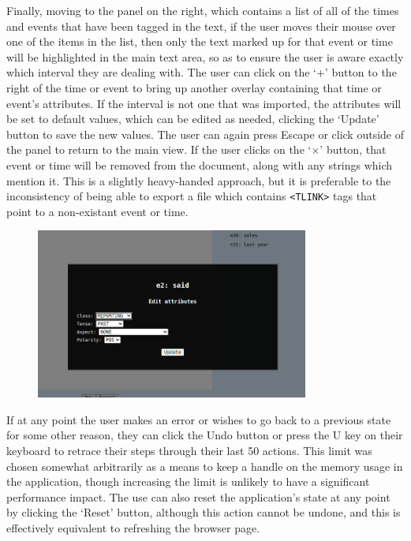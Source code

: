 \documentclass[a4paper,12pt,leqno]{article}
\begin{document}
Finally, moving to the panel on the right, which contains a list of all of the times and events that have been tagged in the text, if the user moves their mouse over one of the items in the list, then only the text marked up for that event or time will be highlighted in the main text area, so as to ensure the user is aware exactly which interval they are dealing with. The user can click on the `+' button to the right of the time or event to bring up another overlay containing that time or event's attributes. If the interval is not one that was imported, the attributes will be set to default values, which can be edited as needed, clicking the `Update' button to save the new values. The user can again press Escape or click outside of the panel to return to the main view. If the user clicks on the `$\times$' button, that event or time will be removed from the document, along with any strings which mention it. This is a slightly heavy-handed approach, but it is preferable to the inconsistency of being able to export a file which contains \verb|<TLINK>| tags that point to a non-existant event or time.
\begin{center}
	\begin{figure}[h!]
		\centering
		\includegraphics[width=0.8\textwidth]{images/START-event-attrs.png}
	\end{figure}
\end{center}
If at any point the user makes an error or wishes to go back to a previous state for some other reason, they can click the Undo button or press the U key on their keyboard to retrace their steps through their last 50 actions. This limit was chosen somewhat arbitrarily as a means to keep a handle on the memory usage in the application, though increasing the limit is unlikely to have a significant performance impact. The use can also reset the application's state at any point by clicking the `Reset' button, although this action cannot be undone, and this is effectively equivalent to refreshing the browser page.
\end{document}
